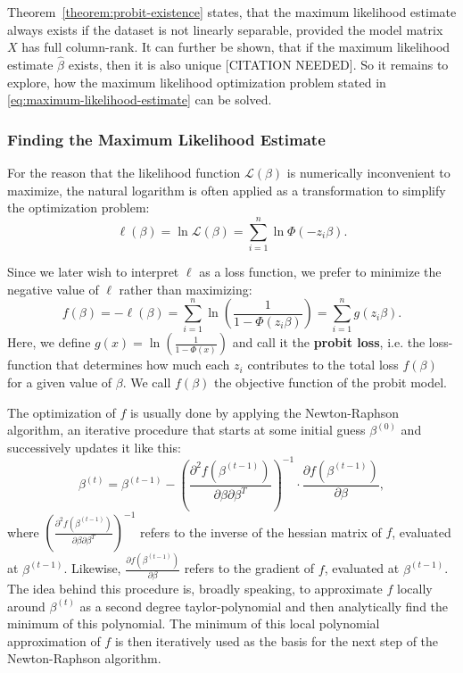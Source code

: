 \noindent Theorem~\ref{theorem:probit-existence} states,
that the maximum likelihood estimate always exists if the dataset
is not linearly separable, provided the model matrix $X$ has
full column-rank.
It can further be shown, that if the maximum likelihood estimate
$\hat{\beta}$ exists, then it is also unique [CITATION NEEDED].
So it remains to explore, how the maximum likelihood optimization
problem stated in \ref{eq:maximum-likelihood-estimate}
can be solved.

\subsubsection{Finding the Maximum Likelihood Estimate}

For the reason that the likelihood function $\mathcal{L}(\beta)$ is
numerically inconvenient to maximize, the natural logarithm is often
applied as a transformation to simplify the optimization problem:
\begin{equation}
    \ell(\beta) = \ln \mathcal{L}(\beta) = \sum_{i=1}^n \ln \Phi(- z_i \beta).
\end{equation}

\noindent Since we later wish to interpret $\ell$ as a loss function, we prefer
to minimize the negative value of $\ell$ rather than maximizing:
\begin{equation}
    f(\beta) = -\ell(\beta)
    = \sum_{i=1}^n \ln \left( \frac{1}{1 - \Phi(z_i \beta)} \right)
    = \sum_{i=1}^n g(z_i \beta).
\end{equation}
Here, we define $g(x) = \ln \left(\frac{1}{1 - \Phi(x)}\right)$
and call it the \textbf{probit loss}, i.e. the loss-function that
determines how much each $z_i$ contributes to the total loss $f(\beta)$
for a given value of $\beta$.
We call $f(\beta)$ the objective function of the probit model.

The optimization of $f$ is usually done by applying the
Newton-Raphson algorithm, an iterative procedure that
starts at some initial guess $\beta^{(0)}$ and successively
updates it like this:
\begin{equation}
    \beta^{(t)} = \beta^{(t-1)} - \left(\frac{\partial^2f(\beta^{(t-1)})}{\partial\beta\partial\beta^T}\right)^{-1}
    \cdot \frac{\partial f(\beta^{(t-1)})}{\partial\beta},
\end{equation}
where $\left(\frac{\partial^2f(\beta^{(t-1)})}{\partial\beta\partial\beta^T}\right)^{-1}$
refers to the inverse of the hessian matrix of $f$, evaluated at
$\beta^{(t-1)}$. Likewise, $\frac{\partial f(\beta^{(t-1)})}{\partial\beta}$
refers to the gradient of $f$, evaluated at $\beta^{(t-1)}$.
The idea behind this procedure is, broadly speaking, to approximate
$f$ locally around $\beta^{(t)}$ as a second degree taylor-polynomial and then
analytically find the minimum of this polynomial. The minimum of this
local polynomial approximation of $f$ is then
iteratively used as the basis for the next step of the
Newton-Raphson algorithm.

